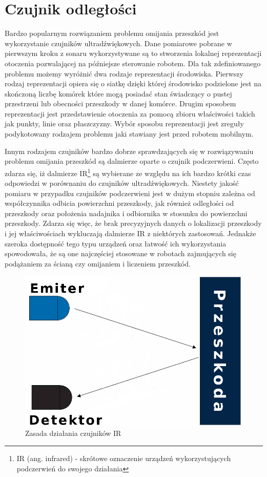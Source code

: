 \section{Czujnik odległości}
Bardzo popularnym rozwiązaniem problemu omijania przeszkód jest wykorzystanie
czujników ultradźwiękowych. Dane pomiarowe pobrane w pierwszym kroku z sonaru
wykorzystywane są to stworzenia lokalnej reprezentacji otoczenia pozwalającej na
późniejsze sterowanie robotem\cite{ObstaclesAvoidanceIR}. Dla tak zdefiniowanego
problemu możemy wyróżnić dwa rodzaje reprezentacji środowiska. Pierwszy rodzaj
reprezentacji opiera się o siatkę dzięki której środowisko podzielone jest na
skończoną liczbę komórek które mogą posiadać stan świadczący o pustej przestrzeni
lub obecności przeszkody w danej komórce. Drugim sposobem reprezentacji jest
przedstawienie otoczenia za pomocą zbioru właściwości takich jak punkty, linie
oraz płaszczyzny. Wybór sposobu reprezentacji jest zreguły podykotowany rodzajem
problemu jaki stawiany jest przed robotem mobilnym.

Innym rodzajem czujników bardzo dobrze sprawdzających się w rozwiązywaniu
problemu omijania przeszkód są dalmierze oparte o czujnik podczerwieni. Często
zdarza się, iż dalmierze IR\footnote{IR (ang. infrared) - skrótowe oznaczenie
urządzeń wykorzystujących podczerwień do swojego działania} są wybierane ze
względu na ich bardzo krótki czas odpowiedzi w porównaniu do czujników
ultradźwiękowych. Niestety jakość pomiaru w przypadku
czujników podczerwieni jest w dużym stopniu zależna od współczynnika odbicia
powierzchni przeszkody, jak również odległości od przeszkody oraz położenia
nadajnika i odbiornika w stosunku do powierzchni przeszkody. Zdarza się więc, że
brak precyzyjnych danych o lokalizacji przeszkody i jej właściwościach
wykluczają dalmierze IR z niektórych zastosowań. Jednakże szeroka dostępność
tego typu urządzeń oraz łatwość ich wykorzystania spowodowała, że są one
najczęściej stosowane w robotach zajmujących się podążaniem za ścianą czy
omijaniem i liczeniem przeszkód.

\begin{figure}
 \centering
 \includegraphics[height=0.3\textwidth]{../images/ch04/ir_sensor.png}
 \caption{Zasada działania czujników IR}
 \label{fig:IRSensors}
\end{figure}

